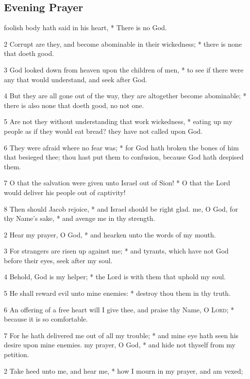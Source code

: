 \subsection{Evening Prayer}
 foolish body hath said in his heart, * There is no God.\par
2 Corrupt are they, and become abominable in their wickedness; * there is none that doeth good.\par
3 God looked down from heaven upon the children of men, * to see if there were any that would understand, and seek after God.\par
4 But they are all gone out of the way, they are altogether become abominable; * there is also none that doeth good, no not one.\par
5 Are not they without understanding that work wickedness, * eating up my people as if they would eat bread? they have not called upon God.\par
6 They were afraid where no fear was; * for God hath broken the bones of him that besieged thee; thou hast put them to confusion, because God hath despised them.\par
7 O that the salvation were given unto Israel out of Sion! * O that the Lord would deliver his people out of captivity!\par
8 Then should Jacob rejoice, * and Israel should be right glad.
 me, O God, for thy Name's sake, * and avenge me in thy strength.\par
2 Hear my prayer, O God, * and hearken unto the words of my mouth.\par
3 For strangers are risen up against me; * and tyrants, which have not God before their eyes, seek after my soul.\par
4 Behold, God is my helper; * the Lord is with them that uphold my soul.\par
5 He shall reward evil unto mine enemies: * destroy thou them in thy truth.\par
6 An offering of a free heart will I give thee, and praise thy Name, O {\textsc{Lord}}; * because it is so comfortable.\par
7 For he hath delivered me out of all my trouble; * and mine eye hath seen his desire upon mine enemies.
 my prayer, O God, * and hide not thyself from my petition.\par
2 Take heed unto me, and hear me, * how I mourn in my prayer, and am vexed;\par
